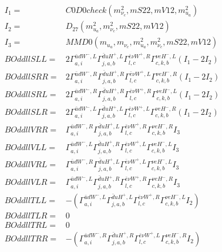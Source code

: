 \documentclass[A4,landscape]{article}
\begin{document}
\begin{align} 
I_1 = & C0D0check(m^2_{\nu_{{c}}}, mS22, mV12, m^2_{u_{{a}}}) \\ 
I_2 = & D_{27}(m^2_{u_{{a}}}, m^2_{\nu_{{c}}}, mS22, mV12) \\ 
I_3 = & MMD0(m_{u_{{a}}}, m_{\nu_{{c}}}, m^2_{u_{{a}}}, m^2_{\nu_{{c}}}, mS22, mV12) \\ 
  BOddllSLL= & 2  \Gamma^{\bar{u}d W^-,L}_{a, i} \Gamma^{\bar{d}u H^+,L}_{j, a, b} \Gamma^{\bar{e}\nu W^+ ,R}_{l, c} \Gamma^{\nu e H^- ,L}_{c, k, b} (I_1 - 2 I_2) \\ 
  BOddllSRR= & 2  \Gamma^{\bar{u}d W^-,R}_{a, i} \Gamma^{\bar{d}u H^+,R}_{j, a, b} \Gamma^{\bar{e}\nu W^+ ,L}_{l, c} \Gamma^{\nu e H^- ,R}_{c, k, b} (I_1 - 2 I_2) \\ 
  BOddllSRL= & 2  \Gamma^{\bar{u}d W^-,R}_{a, i} \Gamma^{\bar{d}u H^+,R}_{j, a, b} \Gamma^{\bar{e}\nu W^+ ,R}_{l, c} \Gamma^{\nu e H^- ,L}_{c, k, b} (I_1 - 2 I_2) \\ 
  BOddllSLR= & 2  \Gamma^{\bar{u}d W^-,L}_{a, i} \Gamma^{\bar{d}u H^+,L}_{j, a, b} \Gamma^{\bar{e}\nu W^+ ,L}_{l, c} \Gamma^{\nu e H^- ,R}_{c, k, b} (I_1 - 2 I_2) \\ 
  BOddllVRR= &  \Gamma^{\bar{u}d W^-,R}_{a, i} \Gamma^{\bar{d}u H^+,L}_{j, a, b} \Gamma^{\bar{e}\nu W^+ ,R}_{l, c} \Gamma^{\nu e H^- ,R}_{c, k, b} I_3 \\ 
  BOddllVLL= &  \Gamma^{\bar{u}d W^-,L}_{a, i} \Gamma^{\bar{d}u H^+,R}_{j, a, b} \Gamma^{\bar{e}\nu W^+ ,L}_{l, c} \Gamma^{\nu e H^- ,L}_{c, k, b} I_3 \\ 
  BOddllVRL= &  \Gamma^{\bar{u}d W^-,R}_{a, i} \Gamma^{\bar{d}u H^+,L}_{j, a, b} \Gamma^{\bar{e}\nu W^+ ,L}_{l, c} \Gamma^{\nu e H^- ,L}_{c, k, b} I_3 \\ 
  BOddllVLR= &  \Gamma^{\bar{u}d W^-,L}_{a, i} \Gamma^{\bar{d}u H^+,R}_{j, a, b} \Gamma^{\bar{e}\nu W^+ ,R}_{l, c} \Gamma^{\nu e H^- ,R}_{c, k, b} I_3 \\ 
  BOddllTLL= & -( \Gamma^{\bar{u}d W^-,L}_{a, i} \Gamma^{\bar{d}u H^+,L}_{j, a, b} \Gamma^{\bar{e}\nu W^+ ,R}_{l, c} \Gamma^{\nu e H^- ,L}_{c, k, b} I_2) \\ 
  BOddllTLR= & 0 \\ 
  BOddllTRL= & 0 \\ 
  BOddllTRR= & -( \Gamma^{\bar{u}d W^-,R}_{a, i} \Gamma^{\bar{d}u H^+,R}_{j, a, b} \Gamma^{\bar{e}\nu W^+ ,L}_{l, c} \Gamma^{\nu e H^- ,R}_{c, k, b} I_2) \\ 
\end{align} 
\end{document}
